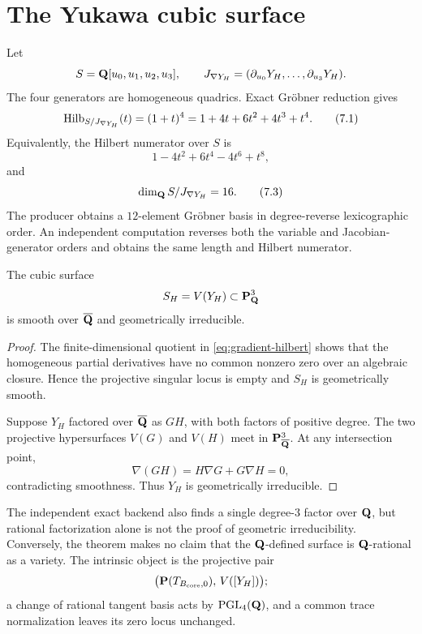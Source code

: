 \section{The Yukawa cubic surface}
\label{sec:cubic-surface}

Let
\[
 S=\mathbf Q[u_0,u_1,u_2,u_3],\qquad
 J_{\nabla Y_H}
 =(\partial_{u_0}Y_H,\ldots,\partial_{u_3}Y_H).
\]
The four generators are homogeneous quadrics.  Exact Gr\"obner reduction
gives
\[
 \operatorname{Hilb}_{S/J_{\nabla Y_H}}(t)=(1+t)^4
 =1+4t+6t^2+4t^3+t^4.
\tag{7.1}
\label{eq:gradient-hilbert}
\]
Equivalently, the Hilbert numerator over \(S\) is
\[
 1-4t^2+6t^4-4t^6+t^8,                            \tag{7.2}
\]
and
\[
 \dim_\mathbf Q S/J_{\nabla Y_H}=16.                      \tag{7.3}
\]
The producer obtains a \(12\)-element Gr\"obner basis in degree-reverse
lexicographic order.  An independent computation reverses both the variable
and Jacobian-generator orders and obtains the same length and Hilbert
numerator.

\begin{theorem}
\label{thm:cubic-surface}
The cubic surface
\[
 S_H=V(Y_H)\subset\mathbf P^3_\mathbf Q
\]
is smooth over \(\overline{\mathbf Q}\) and geometrically irreducible.
\end{theorem}

\begin{proof}
The finite-dimensional quotient in \cref{eq:gradient-hilbert} shows that
the homogeneous partial derivatives have no common nonzero zero over an
algebraic closure.  Hence the projective singular locus is empty and
\(S_H\) is geometrically smooth.

Suppose \(Y_H\) factored over \(\overline{\mathbf Q}\) as \(GH\), with both factors
of positive degree.  The two projective hypersurfaces \(V(G)\) and \(V(H)\)
meet in \(\mathbf P^3_{\overline{\mathbf Q}}\).  At any intersection point,
\[
 \nabla(GH)=H\nabla G+G\nabla H=0,
\]
contradicting smoothness.  Thus \(Y_H\) is geometrically irreducible.
\end{proof}

The independent exact backend also finds a single degree-\(3\) factor over
\(\mathbf Q\), but rational factorization alone is not the proof of geometric
irreducibility.  Conversely, the theorem makes no claim that the
\(\mathbf Q\)-defined surface is \(\mathbf Q\)-rational as a variety.  The intrinsic
object is the projective pair
\[
 \bigl(\mathbf P(T_{B_{\mathrm{core}},0}),\,V([Y_H])\bigr);
\]
a change of rational tangent basis acts by
\(\operatorname{PGL}_4(\mathbf Q)\), and a common trace normalization leaves its
zero locus unchanged.
